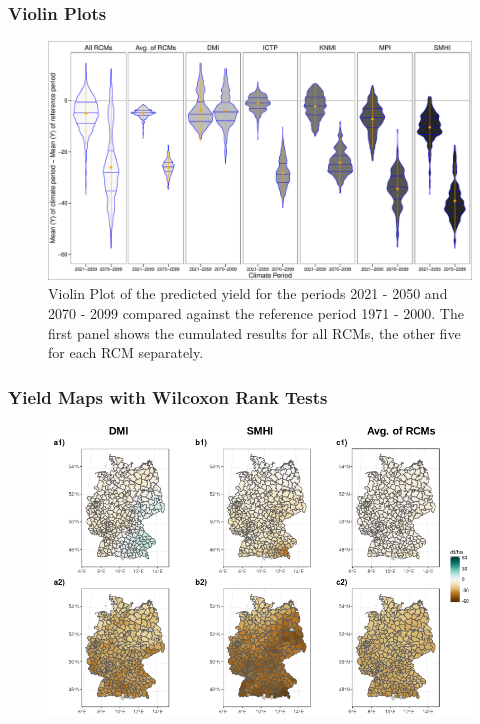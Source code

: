 \documentclass[12pt]{iopart}
\begin{document}
\subsubsection{Violin Plots}
\begin{figure}
	\label{violin:1f}
	\centering
	\includegraphics[width=1\textwidth]{figures/ViolinPlot_meanMinusMean.pdf}
	\caption{Violin Plot of the predicted yield for the periods 2021 - 2050 and 2070 - 2099 compared against the reference period 1971 - 2000. The first panel shows the cumulated results for all RCMs, the other five for each RCM separately.}
\end{figure}

\subsubsection{Yield Maps with Wilcoxon Rank Tests}
\begin{figure}
	\label{map:1f}
	\centering
	\includegraphics[width=1\textwidth]{figures/plot_mean_yield_SMI_6_Jun_Aug_ExtremesAndAvg.png}
	\caption{}
\end{figure}
\end{document}
